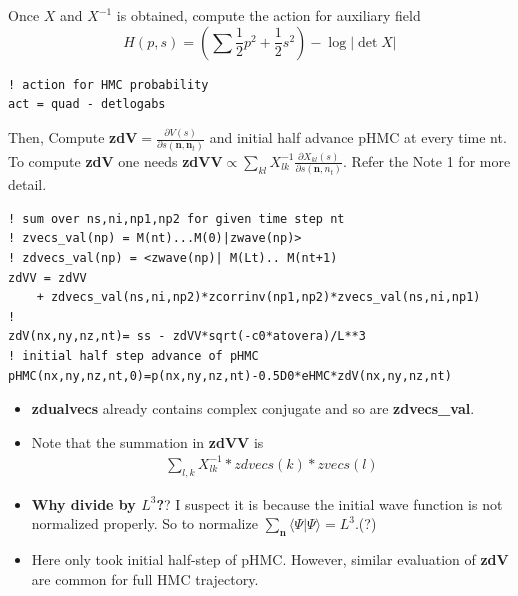 \documentclass[10pt]{book}
\def\bm{\boldsymbol}
\newcommand{\bea}{\begin{eqnarray}}
\newcommand{\eea}{\end{eqnarray}}
\newcommand{\del}{\partial}
\def\vn{{\bm n}}
\def\la{\langle}
\def\ra{\rangle}
\begin{document}
Once $X$ and $X^{-1}$ is obtained, compute the action for auxiliary field
$$ H(p,s)=\left(\sum \frac{1}{2}p^2+\frac{1}{2}s^2\right) -\log|\det X|$$
\begin{lstlisting}[frame=single]
! action for HMC probability 
act = quad - detlogabs
\end{lstlisting}
Then, Compute {\bf zdV}$=\frac{\del V(s)}{\del s({\bm n},{\bm n}_t)}$ and initial half advance pHMC at every time nt.
To compute {\bf zdV} one needs {\bf zdVV}$\propto \sum_{kl} X^{-1}_{lk}\frac{\del X_{kl}(s)}{\del s(\vn,n_t)} $.
{\color{red} Refer the Note 1 for more detail.}
\begin{lstlisting}[frame=single]
! sum over ns,ni,np1,np2 for given time step nt
! zvecs_val(np) = M(nt)...M(0)|zwave(np)>
! zdvecs_val(np) = <zwave(np)| M(Lt).. M(nt+1)
zdVV = zdVV 
    + zdvecs_val(ns,ni,np2)*zcorrinv(np1,np2)*zvecs_val(ns,ni,np1)
! 
zdV(nx,ny,nz,nt)= ss - zdVV*sqrt(-c0*atovera)/L**3
! initial half step advance of pHMC
pHMC(nx,ny,nz,nt,0)=p(nx,ny,nz,nt)-0.5D0*eHMC*zdV(nx,ny,nz,nt)
\end{lstlisting}
\begin{itemize}
	\item {\bf zdualvecs} already contains complex conjugate and so are {\bf zdvecs\_val}.
	\item Note that the summation in {\bf zdVV} is 
	   \bea 
	   \sum_{l,k} X^{-1}_{lk}*zdvecs(k)*zvecs(l)
	   \eea  
	\item  {\bf Why divide by $L^3$?}?  I suspect it is because the initial wave function is not normalized properly. 
	So to normalize $\sum_{\vn}\la \Psi|\Psi\ra=L^3$.(?) 	 
	\item Here only took initial half-step of pHMC. However, similar evaluation 
	 of {\bf zdV} are common for full HMC trajectory. 
\end{itemize}
\end{document}
